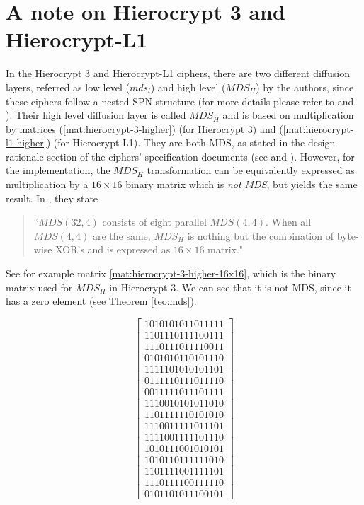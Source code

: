 \documentclass{report}
\begin{document}
\section{A note on Hierocrypt 3 and Hierocrypt-L1}
In the Hierocrypt 3 and Hierocrypt-L1 ciphers, there are two different diffusion layers, referred as low level ($mds_l$) and high level ($MDS_H$) by the authors, since these ciphers follow a nested SPN structure (for more details please refer to \cite{Hierocrypt2000} and \cite{Hierocrypt-L1-2000}). Their high level diffusion layer is called $MDS_H$ and is based on multiplication by matrices (\ref{mat:hierocrypt-3-higher}) (for Hierocrypt 3) and (\ref{mat:hierocrypt-l1-higher}) (for Hierocrypt-L1). They are both MDS, as stated in the design rationale section of the ciphers' specification documents (see \cite{Hierocrypt2000} and \cite{Hierocrypt-L1-2000}). However, for the implementation, the $MDS_H$ transformation can be equivalently expressed as multiplication by a $16 \times 16$ binary matrix which is \emph{not MDS}, but yields the same result. In \cite{Hierocrypt2000}, they state \begin{quote}``$MDS(32, 4)$ consists of eight parallel $MDS(4,4)$. When all $MDS(4,4)$ are the same, $MDS_H$ is nothing but the combination of byte-wise XOR's and is expressed as $16 \times 16$ matrix."\end{quote}

See for example matrix \ref{mat:hierocrypt-3-higher-16x16}, which is the binary matrix used for $MDS_H$ in Hierocrypt 3. We can see that it is not MDS, since it has a zero element (see Theorem \ref{teo:mds}).

\begin{equation}\label{mat:hierocrypt-3-higher-16x16}
\begin{bmatrix}
1010101011011111\\
1101110111100111\\
1110111011110011\\
0101010110101110\\
1111101010101101\\
0111110111011110\\
0011111011101111\\
1110010101011010\\
1101111110101010\\
1110011111011101\\
1111001111101110\\
1010111001010101\\
1010110111111010\\
1101111001111101\\
1110111100111110\\
0101101011100101
\end{bmatrix}
\end{equation}
\end{document}
